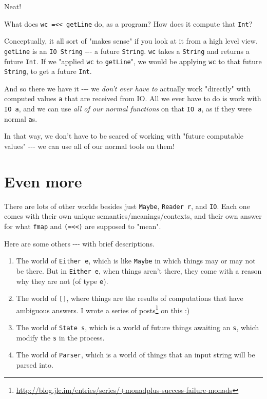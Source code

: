 \documentclass[]{article}
\renewcommand{\href}[2]{#2\footnote{\url{#1}}}
\begin{document}
Neat!

What does \texttt{wc\ =\textless{}\textless{}\ getLine} do, as a program? How
does it compute that \texttt{Int}?

Conceptually, it all sort of "makes sense" if you look at it from a high level
view. \texttt{getLine} is an \texttt{IO\ String} -\/-\/- a future
\texttt{String}. \texttt{wc} takes a \texttt{String} and returns a future
\texttt{Int}. If we "applied \texttt{wc} to \texttt{getLine}", we would be
applying \texttt{wc} to that future \texttt{String}, to get a future
\texttt{Int}.

And so there we have it -\/-\/- we \emph{don't ever have to} actually work
"directly" with computed values \texttt{a} that are received from IO. All we
ever have to do is work with \texttt{IO\ a}, and we can use \emph{all of our
normal functions} on that \texttt{IO\ a}, as if they were normal \texttt{a}s.

In that way, we don't have to be scared of working with "future computable
values" -\/-\/- we can use all of our normal tools on them!

\section{Even more}

There are lots of other worlds besides just \texttt{Maybe}, \texttt{Reader\ r},
and \texttt{IO}. Each one comes with their own unique
semantics/meanings/contexts, and their own answer for what \texttt{fmap} and
\texttt{(=\textless{}\textless{})} are supposed to "mean".

Here are some others -\/-\/- with brief descriptions.

\begin{enumerate}
\item
  The world of \texttt{Either\ e}, which is like \texttt{Maybe} in which things
  may or may not be there. But in \texttt{Either\ e}, when things aren't there,
  they come with a reason why they are not (of type \texttt{e}).
\item
  The world of \texttt{{[}{]}}, where things are the results of computations
  that have ambiguous answers. I wrote a
  \href{http://blog.jle.im/entries/series/+monadplus-success-failure-monads}{series
  of posts} on this :)
\item
  The world of \texttt{State\ s}, which is a world of future things awaiting an
  \texttt{s}, which modify the \texttt{s} in the process.
\item
  The world of \texttt{Parser}, which is a world of things that an input string
  will be parsed into.
\end{enumerate}
\end{document}
